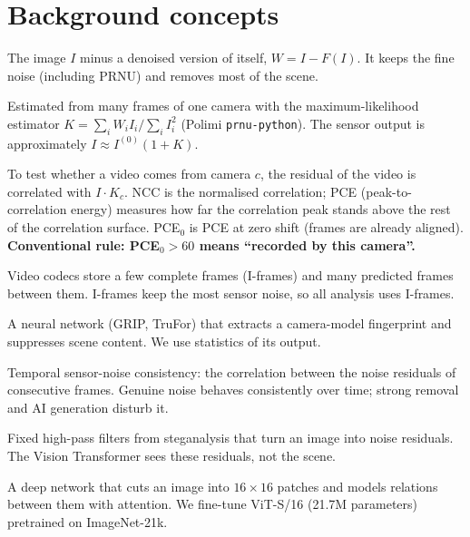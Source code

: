 \documentclass[11pt,a4paper]{article}
\begin{document}
\section{Background concepts}\label{sec:background}
\begin{description}[leftmargin=0pt]
\item[Noise residual $W$.] The image $I$ minus a denoised version of itself, $W = I - F(I)$. It keeps the fine noise
      (including PRNU) and removes most of the scene.
\item[PRNU fingerprint $K$.] Estimated from many frames of one camera with the maximum-likelihood estimator
      $K = \sum_i W_i I_i / \sum_i I_i^2$ (Polimi \texttt{prnu-python}). The sensor output is approximately $I \approx I^{(0)}(1+K)$.
\item[NCC and PCE.] To test whether a video comes from camera $c$, the residual of the video is correlated with $I \cdot K_c$.
      NCC is the normalised correlation; PCE (peak-to-correlation energy) measures how far the correlation peak stands above
      the rest of the correlation surface. PCE$_0$ is PCE at zero shift (frames are already aligned).
      \textbf{Conventional rule: PCE$_0 > 60$ means ``recorded by this camera''.}
\item[I-frames.] Video codecs store a few complete frames (I-frames) and many predicted frames between them. I-frames keep
      the most sensor noise, so all analysis uses I-frames.
\item[Noiseprint++.] A neural network (GRIP, TruFor) that extracts a camera-model fingerprint and suppresses scene content.
      We use statistics of its output.
\item[TSNCS.] Temporal sensor-noise consistency: the correlation between the noise residuals of consecutive frames. Genuine
      noise behaves consistently over time; strong removal and AI generation disturb it.
\item[SRM filters.] Fixed high-pass filters from steganalysis that turn an image into noise residuals. The Vision Transformer
      sees these residuals, not the scene.
\item[Vision Transformer (ViT).] A deep network that cuts an image into $16\times16$ patches and models relations between
      them with attention. We fine-tune ViT-S/16 (21.7M parameters) pretrained on ImageNet-21k.
\end{description}

\end{document}
